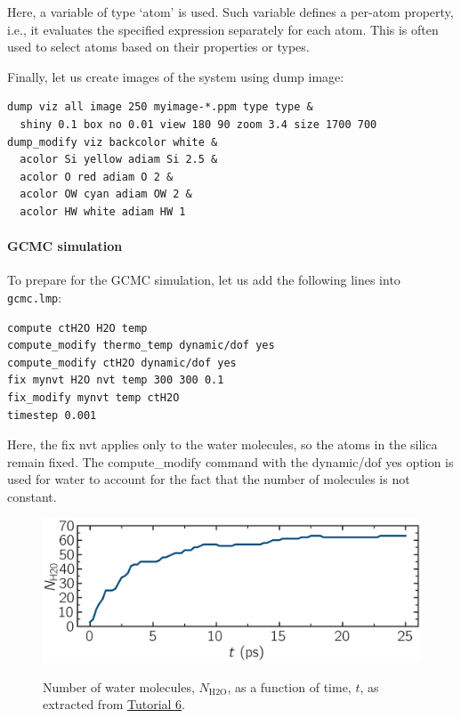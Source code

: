 \documentclass[9pt,tutorial]{livecoms}
\newcommand{\lmpcmd}[1]{\colorbox{listing}{\textcolor{command}{\small{#1}}}} %
\newcommand{\flecmd}[1]{\textcolor{command}{\texttt{#1}}} %
\begin{document}
\begin{note}
{\color{blue}Here, a variable of type `atom' is used.  Such variable
defines a per-atom property, i.e., it evaluates the specified expression
separately for each atom.  This is often used to select atoms based on
their properties or types.}
\end{note}

Finally, let us create images
of the system using \lmpcmd{dump image}:
\begin{lstlisting}
dump viz all image 250 myimage-*.ppm type type &
  shiny 0.1 box no 0.01 view 180 90 zoom 3.4 size 1700 700
dump_modify viz backcolor white &
  acolor Si yellow adiam Si 2.5 &
  acolor O red adiam O 2 &
  acolor OW cyan adiam OW 2 &
  acolor HW white adiam HW 1
\end{lstlisting}

\paragraph{GCMC simulation}

To prepare for the GCMC simulation, let us add the
following lines into \flecmd{gcmc.lmp}:
\begin{lstlisting}
compute ctH2O H2O temp
compute_modify thermo_temp dynamic/dof yes
compute_modify ctH2O dynamic/dof yes
fix mynvt H2O nvt temp 300 300 0.1
fix_modify mynvt temp ctH2O
timestep 0.001
\end{lstlisting}
{\color{blue} Here, the \lmpcmd{fix nvt} applies only to the water molecules, so
the atoms in the silica remain fixed.  The \lmpcmd{compute\_modify} command with
the \lmpcmd{dynamic/dof yes} option is used for water to account for the fact
that the number of molecules is not constant.}

\begin{figure}
\centering
\includegraphics[width=\linewidth]{GCMC-number}\\[-2ex]
\caption{Number of water molecules, $N_\text{H2O}$, as a function of time, $t$,
as extracted from \hyperref[gcmc-silica-label]{Tutorial 6}.}
\label{fig:GCMC-number}
\end{figure}
\end{document}

